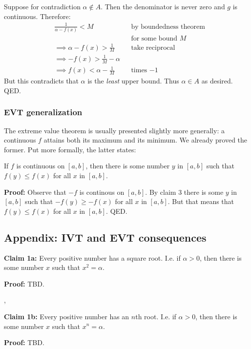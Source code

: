 Suppose for contradiction $\alpha\notin A$. Then the denominator is never zero
and $g$ is continuous. Therefore:
\begin{align*}
&\frac{1}{\alpha-f(x)}<M&&\text{by boundedness theorem}\\
& &&\text{for some bound $M$}\\
&\implies \alpha-f(x)>\frac{1}{M}&&\text{take reciprocal}\\
&\implies -f(x)>\frac{1}{M}-\alpha\\
&\implies f(x)<\alpha-\frac{1}{M}&&\text{times $-1$}
\end{align*}
But this contradicts that $\alpha$ is the \textit{least} upper bound. Thus
$\alpha\in A$ as desired. QED.

\subsubsection*{EVT generalization}

The extreme value theorem is usually presented slightly more
generally: a continuous $f$ attains both its maximum and its minimum.
We already proved the former. Put more formally, the latter states:

\vs

If $f$ is continuous on $[a,b]$, then there is some number $y$ in
$[a,b]$ such that $f(y)\leq f(x)$ for all $x$ in $[a,b]$.

\vs

\textbf{Proof:} Observe that $-f$ is continous on $[a,b]$. By claim 3
there is some $y$ in $[a,b]$ such that $-f(y)\geq-f(x)$ for all $x$ in
$[a,b]$. But that means that $f(y)\leq f(x)$ for all $x$ in $[a,b]$. QED.


\subsection{Appendix: IVT and EVT consequences}

\textbf{Claim 1a:} Every positive number has a square root. I.e. if
$\alpha>0$, then there is some number $x$ such that $x^{2}=\alpha$.

\vs

\textbf{Proof:} TBD.

\sep

\textbf{Claim 1b:} Every positive number has an $n$th root. I.e. if
$\alpha>0$, then there is some number $x$ such that $x^{n}=\alpha$.

\vs

\textbf{Proof:} TBD.

